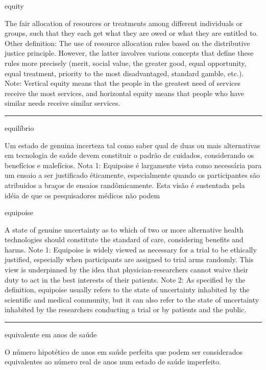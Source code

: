 \documentclass[
]{book}
\begin{document}
equity

The fair allocation of resources or treatments among different individuals or groups, such that they each get what they are owed or what they are entitled to. Other definition: The use of resource allocation rules based on the distributive justice principle. However, the latter involves various concepts that define these rules more precisely (merit, social value, the greater good, equal opportunity, equal treatment, priority to the most disadvantaged, standard gamble, etc.). Note: Vertical equity means that the people in the greatest need of services receive the most services, and horizontal equity means that people who have similar needs receive similar services.

\begin{center}\rule{0.5\linewidth}{0.5pt}\end{center}

equilíbrio

Um estado de genuina incerteza tal como saber qual de duas ou mais alternativas em tecnologia de saúde devem constituir o padrão de cuidados, considerando os benefícios e malefícios. Nota 1: Equipoise é largamente vista como necessária para um ensaio a ser justificado éticamente, especialmente quando os participantes são atribuidos a braços de ensaios randômicamente. Esta visão é sustentada pela idéia de que os pesquisadores médicos não podem

equipoise

A state of genuine uncertainty as to which of two or more alternative health technologies should constitute the standard of care, considering benefits and harms. Note 1: Equipoise is widely viewed as necessary for a trial to be ethically justified, especially when participants are assigned to trial arms randomly. This view is underpinned by the idea that physician-researchers cannot waive their duty to act in the best interests of their patients. Note 2: As specified by the definition, equipoise usually refers to the state of uncertainty inhabited by the scientific and medical community, but it can also refer to the state of uncertainty inhabited by the researchers conducting a trial or by patients and the public.

\begin{center}\rule{0.5\linewidth}{0.5pt}\end{center}

equivalente em anos de saúde

O número hipotético de anos em saúde perfeita que podem ser considerados equivalentes ao número real de anos num estado de saúde imperfeito.
\end{document}
